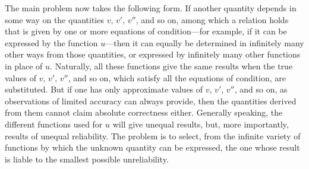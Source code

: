 The main problem now takes the following form. If another quantity depends in some way on the quantities \(v,\,v',\,v''\), and so on, among which a relation holds that is given by one or more equations of condition—for example, if it can be expressed by the function \(u\)—then it can equally be determined in infinitely many other ways from those quantities, or expressed by infinitely many other functions in place of \(u\). Naturally, all these functions give the same results when the true values of \(v,\,v',\,v''\), and so on, which satisfy all the equations of condition, are substituted. But if one has only approximate values of \(v,\,v',\,v''\), and so on, as observations of limited accuracy can always provide, then %
the quantities derived from them cannot claim absolute correctness either. Generally speaking, the different functions used for \(u\) will give unequal results, but, more importantly, results of unequal reliability. The problem is to select, from the infinite variety of functions by which the unknown quantity can be expressed, the one whose result is liable to the smallest possible unreliability.

